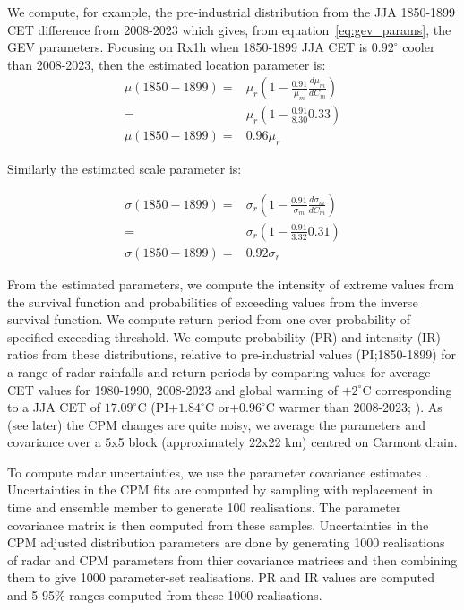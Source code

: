 \documentclass[11pt,a4paper]{article}
\begin{document}
We compute, for example, the pre-industrial distribution from  the  JJA 1850-1899 CET difference from 2008-2023  which gives, from equation~\ref{eq:gev_params}, the GEV parameters. Focusing  on Rx1h when 1850-1899 JJA CET is $0.92^\circ$ cooler than 2008-2023, then the estimated location parameter is:
 \begin{align*}
 \mu(1850-1899) =& \mu_r \left( 1 - \frac{0.91}{\mu_m} \frac{d\mu_m}{dC_m}\right) \\
   =&  \mu_r \left( 1 - \frac{0.91}{8.30} 0.33\right)\\
  \mu(1850-1899) = &0.96\mu_r
 	\end{align*}
 
 Similarly the estimated scale parameter is:
 
 \begin{align*}
	\sigma(1850-1899) =& \sigma_r \left( 1 - \frac{0.91}{\sigma_m} \frac{d\sigma_m}{dC_m}\right) \\
	=&  \sigma_r \left( 1 -  \frac{0.91}{3.32} 0.31\right)\\
	\sigma(1850-1899) = &0.92\sigma_r
\end{align*}

 From the estimated parameters, we compute the intensity of  extreme values from the survival function and probabilities of exceeding values  from the  inverse survival function. We compute return period from one over probability of specified exceeding threshold. We compute probability (PR) and intensity (IR) ratios from these distributions, relative to pre-industrial values (PI;1850-1899) for a range of radar rainfalls and return periods by comparing values for average CET values for 1980-1990, 2008-2023 and global warming of $+2^\circ$C corresponding to a JJA CET of $17.09^\circ$C (PI$+1.84^\circ$C or$+0.96^\circ$C warmer than 2008-2023; \cite{tett2023edinburgh}). As (see later) the CPM changes are quite noisy, we average the parameters and covariance over a 5x5 block (approximately 22x22 km) centred on Carmont drain.

To compute radar uncertainties, we use the parameter covariance  estimates \parencite{gilleland2016extremes}. Uncertainties in the CPM fits are computed by sampling with replacement\parencite{Efron1994bootstrap} in time and ensemble member  to generate 100 realisations. The parameter covariance matrix is then computed from these samples. Uncertainties in the CPM adjusted distribution parameters are done by generating 1000 realisations of radar and CPM parameters from thier covariance matrices and then  combining them to give 1000 parameter-set realisations. PR and IR values are computed and 5-95\% ranges computed from these 1000 realisations. 
\end{document}
